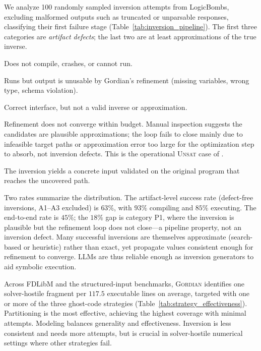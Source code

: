 \documentclass[acmsmall,screen,nonacm]{acmart}
\newenvironment{revblock}{\color{red}}{}
\newenvironment{revblock}{}{}
\newcommand{\projName}{\textsc{Gordian}\xspace}
\theoremstyle{definition}
\begin{document}
\begin{revblock}
We analyze 100 randomly sampled inversion attempts from LogicBombs, excluding malformed outputs such as truncated or unparsable responses, classifying their first failure stage (Table~\ref{tab:inversion_pipeline}). The first three categories are \emph{artifact defects}; the last two are at least approximations of the true inverse.

\begin{description}\itemsep1pt
\item[(A1) Generation/execution failure (7\%).] Does not compile, crashes, or cannot run.
\item[(A2) Interface mismatch (8\%).] Runs but output is unusable by Gordian's refinement (missing variables, wrong type, schema violation).
\item[(A3) Semantically invalid (22\%).] Correct interface, but not a valid inverse or approximation.
\item[(P1) Non-convergence (18\%).] Refinement does not converge within budget. Manual inspection suggests the candidates are plausible approximations; the loop fails to close mainly due to infeasible target paths or approximation error too large for the optimization step to absorb, not inversion defects. This is the operational \textsc{Unsat} case of .
\item[(P2) Successful path trigger (45\%).] The inversion yields a concrete input validated on the original program that reaches the uncovered path.
\end{description}

Two rates summarize the distribution. The artifact-level success rate (defect-free inversions, A1--A3 excluded) is $63\%$, with $93\%$ compiling and $85\%$ executing. The end-to-end rate is $45\%$; the $18\%$ gap is category P1, where the inversion is plausible but the refinement loop does not close---a pipeline property, not an inversion defect. Many successful inversions are themselves approximate (search-based or heuristic) rather than exact, yet propagate values consistent enough for refinement to converge. LLMs are thus reliable enough as inversion generators to aid symbolic execution.


Across FDLibM and the structured-input benchmarks, \projName{} identifies one solver-hostile fragment per \(117.5\) executable lines on average, targeted with one or more of the three ghost-code strategies (Table~\ref{tab:strategy_effectiveness}). Partitioning is the most effective, achieving the highest coverage with minimal attempts. Modeling balances generality and effectiveness. Inversion is less consistent and needs more attempts, but is crucial in solver-hostile numerical settings where other strategies fail.
\end{revblock}
\end{document}
